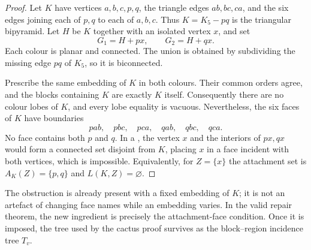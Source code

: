 \begin{proof}
Let $K$ have vertices $a,b,c,p,q$, the triangle edges $ab,bc,ca$, and the
six edges joining each of $p,q$ to each of $a,b,c$.  Thus $K=K_5-pq$ is
the triangular bipyramid.  Let $H$ be $K$ together with an isolated
vertex $x$, and set
\[
 G_1=H+px,\qquad G_2=H+qx.
\]
Each colour is planar and connected.  The union is obtained by
subdividing the missing edge $pq$ of $K_5$, so it is biconnected.

Prescribe the same embedding of $K$ in both colours.  Their common orders
agree, and the blocks containing $K$ are exactly $K$ itself.  Consequently
there are no colour lobes of $K$, and every lobe equality is vacuous.
Nevertheless, the six faces of $K$ have boundaries
\[
 pab,\quad pbc,\quad pca,\quad qab,\quad qbc,\quad qca.
\]
No face contains both $p$ and $q$.  In a \SEFE{}, the vertex $x$ and the
interiors of $px,qx$ would form a connected set disjoint from $K$, placing
$x$ in a face incident with both vertices, which is impossible.  Equivalently,
for $Z=\{x\}$ the attachment set is $A_K(Z)=\{p,q\}$ and
$L(K,Z)=\varnothing$.
\end{proof}

The obstruction is already present with a fixed embedding of $K$; it is
not an artefact of changing face names while an embedding varies.  In the
valid repair theorem, the new ingredient is precisely the attachment-face
condition.  Once it is imposed, the tree used by the cactus proof survives
as the block--region incidence tree $T_v$.
